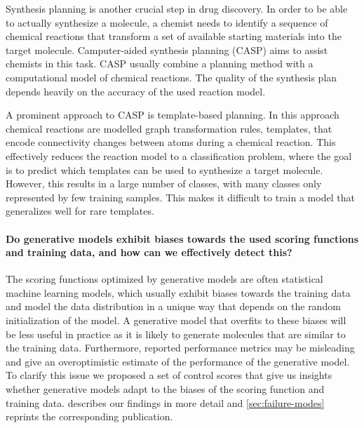 Synthesis planning is another crucial step in drug discovery.
In order to be able to actually synthesize a molecule, a chemist needs to
identify a sequence of chemical reactions that transform a set of available starting
materials into the target molecule. Camputer-aided synthesis planning (CASP)
aims to assist chemists in this task. CASP usually combine a planning method
with a computational model of chemical reactions. The quality of the
synthesis plan depends heavily on the accuracy of the used reaction model.

A prominent approach to CASP is template-based planning. In this approach
chemical reactions are modelled graph transformation rules, templates, that
encode connectivity changes between atoms during a chemical reaction.
This effectively reduces the reaction model to a classification problem, where
the goal is to predict which templates can be used to synthesize a target molecule.
However, this results in a large number of classes, with many classes only
represented by few training samples. This makes it difficult to train a model
that generalizes well for rare templates.

\paragraph{Do generative models exhibit biases towards the used scoring
    functions and training data, and how can we effectively detect this?} The
scoring functions optimized by generative models are often statistical
machine learning models, which usually exhibit biases towards the training
data and model the data distribution in a unique way that depends on the
random initialization of the model. A generative model that overfits to
these biases will be less useful in practice as it is likely to generate
molecules that are similar to the training data. Furthermore, reported
performance metrics may be misleading and give an overoptimistic estimate of
the performance of the generative model. To clarify this issue we proposed a
set of control scores that give us insights whether generative models adapt
to the biases of the scoring function and training data.
 describes our findings in more detail and
\cref{sec:failure-modes} reprints the corresponding publication.

